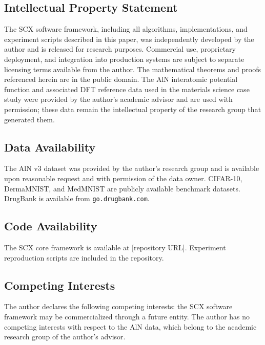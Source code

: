 \documentclass{article}
\begin{document}

\subsection*{Intellectual Property Statement}
The SCX software framework, including all algorithms, implementations, and experiment scripts described in this paper, was independently developed by the author and is released for research purposes. Commercial use, proprietary deployment, and integration into production systems are subject to separate licensing terms available from the author. The mathematical theorems and proofs referenced herein are in the public domain. The AlN interatomic potential function and associated DFT reference data used in the materials science case study were provided by the author's academic advisor and are used with permission; these data remain the intellectual property of the research group that generated them.

\subsection*{Data Availability}
The AlN v3 dataset was provided by the author's research group and is available upon reasonable request and with permission of the data owner. CIFAR-10, DermaMNIST, and MedMNIST are publicly available benchmark datasets. DrugBank is available from \texttt{go.drugbank.com}.

\subsection*{Code Availability}
The SCX core framework is available at [repository URL]. Experiment reproduction scripts are included in the repository.

\subsection*{Competing Interests}
The author declares the following competing interests: the SCX software framework may be commercialized through a future entity. The author has no competing interests with respect to the AlN data, which belong to the academic research group of the author's advisor.
\end{document}
